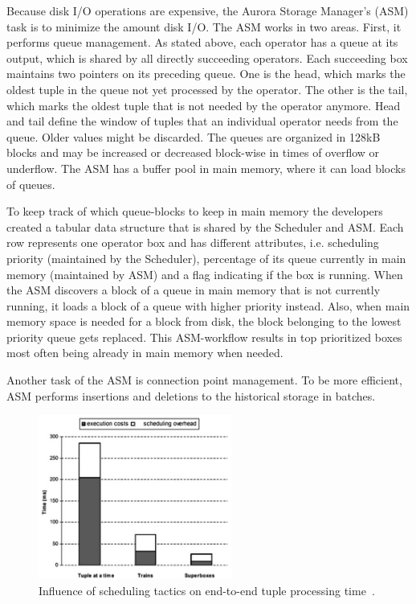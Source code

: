 Because disk I/O operations are expensive, the Aurora Storage Manager's (ASM) task is to minimize the amount disk I/O. The ASM works in two areas. First, it performs queue management. As stated above, each operator has a queue at its output, which is shared by all directly succeeding operators. Each succeeding box maintains two pointers on its preceding queue. One is the head, which marks the oldest tuple in the queue not yet processed by the operator. The other is the tail, which marks the oldest tuple that is not needed by the operator anymore. Head and tail define the window of tuples that an individual operator needs from the queue. Older values might be discarded. The queues are organized in 128kB blocks and may be increased or decreased block-wise in times of overflow or underflow. The ASM has a buffer pool in main memory, where it can load blocks of queues.

To keep track of which queue-blocks to keep in main memory the developers created a tabular data structure that is shared by the Scheduler and ASM. Each row represents one operator box and has different attributes, i.e. scheduling priority (maintained by the Scheduler), percentage of its queue currently in main memory (maintained by ASM) and a flag indicating if the box is running. When the ASM discovers a block of a queue in main memory that is not currently running, it loads a block of a queue with higher priority instead. Also, when main memory space is needed for a block from disk, the block belonging to the lowest priority queue gets replaced. This ASM-workflow results in top prioritized boxes most often being already in main memory when needed.

Another task of the ASM is connection point management. To be more efficient, ASM performs insertions and deletions to the historical storage in batches.

\begin{figure}[!t]
\centering
\includegraphics[width=2.5in]{./img/AuroraSchedulingPerformance.png}
\caption{Influence of scheduling tactics on end-to-end tuple processing time~\cite{Aurora2003}.}
\label{fig_aurora_scheduling_performance}
\end{figure}

